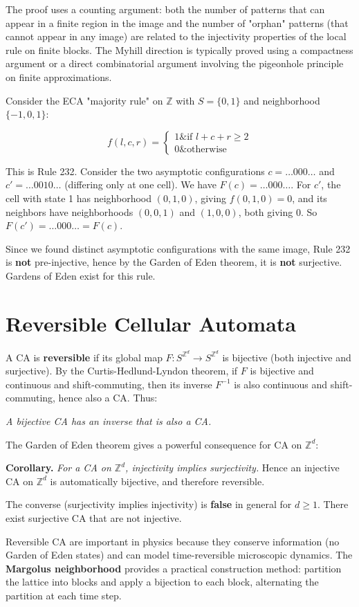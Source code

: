 The proof uses a counting argument: both the number of patterns that can appear in a finite region in the image and the number of "orphan" patterns (that cannot appear in any image) are related to the injectivity properties of the local rule on finite blocks. The Myhill direction is typically proved using a compactness argument or a direct combinatorial argument involving the pigeonhole principle on finite approximations.

\begin{example}
Consider the ECA "majority rule" on $\mathbb{Z}$ with $S = \{ 0,1\} $ and neighborhood $\{ -1, 0, 1\} $:

\[f(l, c, r) = \begin{cases} 1 \& \text{if } l + c + r \geq 2 \\ 0 \& \text{otherwise} \end{cases}\]

This is Rule 232. Consider the two asymptotic configurations $c = \ldots 000 \ldots$ and $c' = \ldots 0010 \ldots$ (differing only at one cell). We have $F(c) = \ldots 000 \ldots$. For $c'$, the cell with state 1 has neighborhood $(0,1,0)$, giving $f(0,1,0) = 0$, and its neighbors have neighborhoods $(0,0,1)$ and $(1,0,0)$, both giving 0. So $F(c') = \ldots 000 \ldots = F(c)$.

Since we found distinct asymptotic configurations with the same image, Rule 232 is \textbf{not} pre-injective, hence by the Garden of Eden theorem, it is \textbf{not} surjective. Gardens of Eden exist for this rule.
\end{example}


\section{Reversible Cellular Automata}

A CA is \textbf{reversible} if its global map $F: S^{\mathbb{Z}^d} \to S^{\mathbb{Z}^d}$ is bijective (both injective and surjective). By the Curtis-Hedlund-Lyndon theorem, if $F$ is bijective and continuous and shift-commuting, then its inverse $F^{-1}$ is also continuous and shift-commuting, hence also a CA. Thus:

\begin{theorem}
\textit{A bijective CA has an inverse that is also a CA.}

The Garden of Eden theorem gives a powerful consequence for CA on $\mathbb{Z}^d$:

\textbf{Corollary.} \textit{For a CA on $\mathbb{Z}^d$, injectivity implies surjectivity.} Hence an injective CA on $\mathbb{Z}^d$ is automatically bijective, and therefore reversible.

The converse (surjectivity implies injectivity) is \textbf{false} in general for $d \geq 1$. There exist surjective CA that are not injective.

Reversible CA are important in physics because they conserve information (no Garden of Eden states) and can model time-reversible microscopic dynamics. The \textbf{Margolus neighborhood} provides a practical construction method: partition the lattice into blocks and apply a bijection to each block, alternating the partition at each time step.
\end{theorem}

